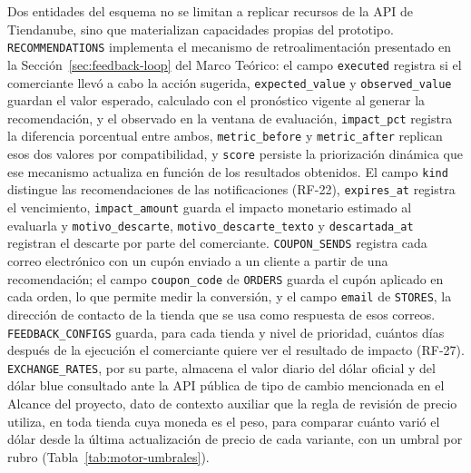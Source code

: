 Dos entidades del esquema no se limitan a replicar recursos de la API de Tiendanube, sino que materializan capacidades propias del prototipo. \texttt{RECOMMENDATIONS} implementa el mecanismo de retroalimentación presentado en la Sección~\ref{sec:feedback-loop} del Marco Teórico: el campo \texttt{executed} registra si el comerciante llevó a cabo la acción sugerida, \texttt{expected\_value} y \texttt{observed\_value} guardan el valor esperado, calculado con el pronóstico vigente al generar la recomendación, y el observado en la ventana de evaluación, \texttt{impact\_pct} registra la diferencia porcentual entre ambos, \texttt{metric\_before} y \texttt{metric\_after} replican esos dos valores por compatibilidad, y \texttt{score} persiste la priorización dinámica que ese mecanismo actualiza en función de los resultados obtenidos. El campo \texttt{kind} distingue las recomendaciones de las notificaciones (RF-22), \texttt{expires\_at} registra el vencimiento, \texttt{impact\_amount} guarda el impacto monetario estimado al evaluarla y \texttt{motivo\_descarte}, \texttt{motivo\_descarte\_texto} y \texttt{descartada\_at} registran el descarte por parte del comerciante. \texttt{COUPON\_SENDS} registra cada correo electrónico con un cupón enviado a un cliente a partir de una recomendación; el campo \texttt{coupon\_code} de \texttt{ORDERS} guarda el cupón aplicado en cada orden, lo que permite medir la conversión, y el campo \texttt{email} de \texttt{STORES}, la dirección de contacto de la tienda que se usa como respuesta de esos correos. \texttt{FEEDBACK\_CONFIGS} guarda, para cada tienda y nivel de prioridad, cuántos días después de la ejecución el comerciante quiere ver el resultado de impacto (RF-27). \texttt{EXCHANGE\_RATES}, por su parte, almacena el valor diario del dólar oficial y del dólar blue consultado ante la API pública de tipo de cambio mencionada en el Alcance del proyecto, dato de contexto auxiliar que la regla de revisión de precio utiliza, en toda tienda cuya moneda es el peso, para comparar cuánto varió el dólar desde la última actualización de precio de cada variante, con un umbral por rubro (Tabla~\ref{tab:motor-umbrales}).

